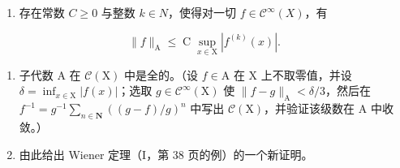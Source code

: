 \begin{enumerate}
\def\labelenumi{\alph{enumi})}
\tightlist
\item
  存在常数 \(C \geqslant 0\) 与整数 \(k \in N\)，使得对一切 \(f \in \mathcal{C}^{\infty}(X)\)，有
\end{enumerate}

\[
\| f \| _ {\mathrm{A}} \leqslant \operatorname * {C} \sup _ {x \in \mathrm{X}} | f ^ {(k)} (x) |.
\]

\begin{enumerate}
\def\labelenumi{\alph{enumi})}
\setcounter{enumi}{1}
\item
  子代数 A 在 \(\mathcal{C}(\mathrm{X})\) 中是全的。（设 \(f \in \mathrm{A}\) 在 X 上不取零值，并设 \(\delta = \inf_{x \in \mathrm{X}} |f(x)|\)；选取 \(g \in \mathcal{C}^{\infty}(\mathrm{X})\) 使 \(\|f - g\|_{\mathrm{A}} < \delta/3\)，然后在 \(f^{-1} = g^{-1} \sum_{n \in \mathbf{N}} ((g - f)/g)^{n}\) 中写出 \(\mathcal{C}(\mathrm{X})\)，并验证该级数在 A 中收敛。）
\item
  由此给出 Wiener 定理（I，第 38 页的例）的一个新证明。
\end{enumerate}

